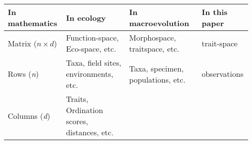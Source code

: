 \documentclass[]{article}
\begin{document}
\begin{longtable}[]{@{}llll@{}}
\toprule
\begin{minipage}[b]{0.20\columnwidth}\raggedright\strut
In mathematics\strut
\end{minipage} & \begin{minipage}[b]{0.16\columnwidth}\raggedright\strut
In ecology\strut
\end{minipage} & \begin{minipage}[b]{0.25\columnwidth}\raggedright\strut
In macroevolution\strut
\end{minipage} & \begin{minipage}[b]{0.20\columnwidth}\raggedright\strut
In this paper\strut
\end{minipage}\tabularnewline
\midrule
\endhead
\begin{minipage}[t]{0.20\columnwidth}\raggedright\strut
Matrix (\(n \times d\))\strut
\end{minipage} & \begin{minipage}[t]{0.16\columnwidth}\raggedright\strut
Function-space, Eco-space, etc.\strut
\end{minipage} & \begin{minipage}[t]{0.25\columnwidth}\raggedright\strut
Morphospace, traitspace, etc.\strut
\end{minipage} & \begin{minipage}[t]{0.20\columnwidth}\raggedright\strut
trait-space\strut
\end{minipage}\tabularnewline
\begin{minipage}[t]{0.20\columnwidth}\raggedright\strut
Rows (\emph{n})\strut
\end{minipage} & \begin{minipage}[t]{0.16\columnwidth}\raggedright\strut
Taxa, field sites, environments, etc.\strut
\end{minipage} & \begin{minipage}[t]{0.25\columnwidth}\raggedright\strut
Taxa, specimen, populations, etc.\strut
\end{minipage} & \begin{minipage}[t]{0.20\columnwidth}\raggedright\strut
observations\strut
\end{minipage}\tabularnewline
\begin{minipage}[t]{0.20\columnwidth}\raggedright\strut
Columns (\emph{d})\strut
\end{minipage} & \begin{minipage}[t]{0.16\columnwidth}\raggedright\strut
Traits, Ordination scores, distances, etc.\strut

\end{minipage}
\end{longtable}
\end{document}
